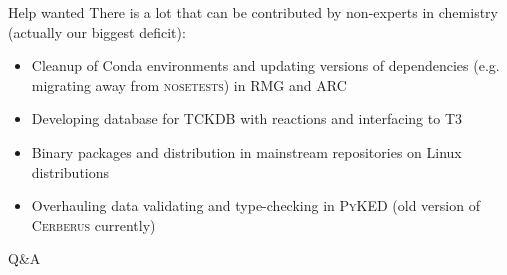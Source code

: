 \begin{frame}{Help wanted}
There is a lot that can be contributed by non-experts in chemistry (actually our biggest deficit):

\begin{itemize}
 \item Cleanup of Conda environments and updating versions of dependencies (e.g. migrating away from \textsc{nosetests}) in \textsc{RMG} and \textsc{ARC}
 \item Developing database for \textsc{TCKDB} with reactions and interfacing to \textsc{T3}
 \item Binary packages and distribution in mainstream repositories on Linux distributions
 \item Overhauling data validating and type-checking in \textsc{PyKED} (old version of \textsc{Cerberus} currently)
\end{itemize}

\end{frame}

\begin{frame}{Q\&A}
 
\end{frame}
